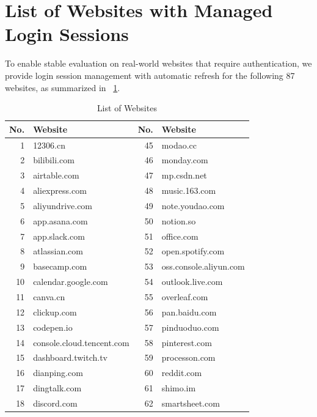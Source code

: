 \section{List of Websites with Managed Login Sessions}
To enable stable evaluation on real-world websites that require authentication, we provide login session management with automatic refresh for the following 87 websites, as summarized in ~\cref{tab:websites}.

\begin{table}[t]
\centering
\caption{List of Websites}
\label{tab:websites}
\renewcommand{\arraystretch}{1.15}
\begin{tabular}{r l r l}
\hline
\textbf{No.} & \textbf{Website} & \textbf{No.} & \textbf{Website} \\
\hline
1  & 12306.cn                  & 45 & modao.cc               \\
2  & bilibili.com      & 46 & monday.com             \\
3  & airtable.com              & 47 & mp.csdn.net            \\
4  & aliexpress.com            & 48 & music.163.com          \\
5  & aliyundrive.com           & 49 & note.youdao.com        \\
6  & app.asana.com             & 50 & notion.so              \\
7  & app.slack.com             & 51 & office.com             \\
8  & atlassian.com             & 52 & open.spotify.com       \\
9  & basecamp.com              & 53 & oss.console.aliyun.com \\
10 & calendar.google.com       & 54 & outlook.live.com       \\
11 & canva.cn                  & 55 & overleaf.com           \\
12 & clickup.com               & 56 & pan.baidu.com          \\
13 & codepen.io                & 57 & pinduoduo.com          \\
14 & console.cloud.tencent.com & 58 & pinterest.com          \\
15 & dashboard.twitch.tv       & 59 & processon.com          \\
16 & dianping.com              & 60 & reddit.com             \\
17 & dingtalk.com              & 61 & shimo.im               \\
18 & discord.com               & 62 & smartsheet.com         \\

\end{tabular}
\end{table}
